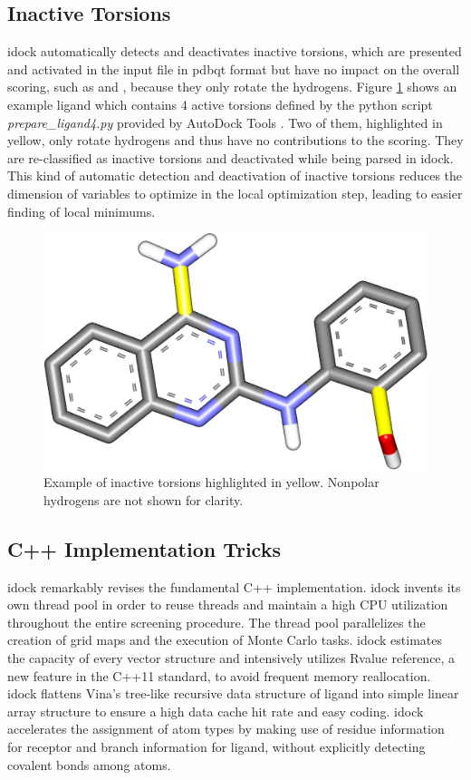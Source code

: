\documentclass[10pt, conference, compsocconf]{IEEEtran}
\begin{document}
\subsection{Inactive Torsions}

idock automatically detects and deactivates inactive torsions, which are presented and activated in the input file in pdbqt format but have no impact on the overall scoring, such as  and , because they only rotate the hydrogens. Figure \ref{fig:InactiveTorsions} shows an example ligand which contains 4 active torsions defined by the python script \textit{prepare\_ligand4.py} provided by AutoDock Tools \cite{785,596}. Two of them, highlighted in yellow, only rotate hydrogens and thus have no contributions to the scoring. They are re-classified as inactive torsions and deactivated while being parsed in idock. This kind of automatic detection and deactivation of inactive torsions reduces the dimension of variables to optimize in the local optimization step, leading to easier finding of local minimums.

\begin{figure}
\centering
\includegraphics[width=0.5\linewidth]{Figures/ZINC00572984.png}
\caption{Example of inactive torsions highlighted in yellow. Nonpolar hydrogens are not shown for clarity.}
\label{fig:InactiveTorsions}
\end{figure}

\subsection{C++ Implementation Tricks}

idock remarkably revises the fundamental C++ implementation. idock invents its own thread pool in order to reuse threads and maintain a high CPU utilization throughout the entire screening procedure. The thread pool parallelizes the creation of grid maps and the execution of Monte Carlo tasks. idock estimates the capacity of every vector structure and intensively utilizes Rvalue reference, a new feature in the C++11 standard, to avoid frequent memory reallocation. idock flattens Vina's tree-like recursive data structure of ligand into simple linear array structure to ensure a high data cache hit rate and easy coding. idock accelerates the assignment of atom types by making use of residue information for receptor and branch information for ligand, without explicitly detecting covalent bonds among atoms.
\end{document}
